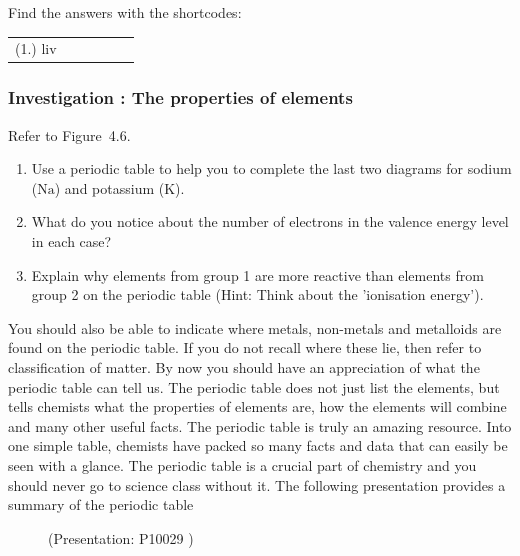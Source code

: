 	\par
      \label{m38757*secfhsst!!!underscore!!!id936}
\par {} Find the answers with the shortcodes:
 \par \begin{tabular}[h]{cccccc}
 (1.) liv  & \end{tabular}
            \subsubsection{ Investigation : The properties of elements }
            \nopagebreak
            \label{m38757*uid798724}Refer to Figure~4.6.
\label{m38757*id261630}\begin{enumerate}[noitemsep, label=\textbf{\arabic*}. ] 
            \label{m38757*uid136}\item Use a periodic table to help you to complete the last two diagrams for sodium ($\mathrm{Na}$) and potassium ($\mathrm{K}$).
\label{m38757*uid137}\item What do you notice about the number of electrons in the valence energy level in each case?
\label{m38757*uid138}\item Explain why elements from group 1 are more reactive than elements from group 2 on the periodic table (Hint: Think about the 'ionisation energy').
\end{enumerate}
        \par 
\label{m38757*eip-921}You should also be able to indicate where metals, non-metals and metalloids are found on the periodic table. If you do not recall where these lie, then refer to classification of matter. \label{m38757*eip-215}By now you should have an appreciation of what the periodic table can tell us. The periodic table does not just list the elements, but tells chemists what the properties of elements are, how the elements will combine and many other useful facts. The periodic table is truly an amazing resource. Into one simple table, chemists have packed so many facts and data that can easily be seen with a glance. The periodic table is a crucial part of chemistry and you should never go to science class without it. \label{m38757*eip-325}The following presentation provides a summary of the periodic table
    \setcounter{subfigure}{0}
	\begin{figure}[H] %
    \label{m38757*slidesharemedia}\label{m38757*slideshareflash} { (Presentation:  P10029 )}
      \vspace{2pt}
    \vspace{.1in}
 \end{figure}       \par 
    \label{m38757*eip-572}
